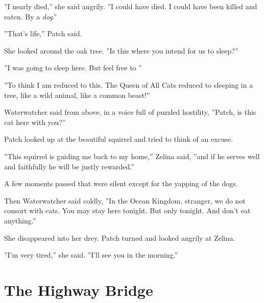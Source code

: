 \documentclass[12pt]{book}
\begin{document}
''I nearly died,'' she said angrily. ''I could have died. I could have been killed and eaten. By a {\it dog}.''\par
''That's life,'' Patch said.\par
She looked around the oak tree. ''Is this where you intend for us to sleep?''\par
''I was going to sleep here. But feel free to%
''\par
''To think I am reduced to this. The Queen of All Cats reduced to sleeping in a tree, like a wild animal, like a common beast!''\par
Waterwatcher said from above, in a voice full of puzzled hostility, ''Patch, is this cat here with you?''\par
Patch looked up at the beautiful squirrel and tried to think of an excuse.\par
''This squirrel is guiding me back to my home,'' Zelina said, ''and if he serves well and faithfully he will be justly rewarded.''\par
A few moments passed that were silent except for the yapping of the dogs.\par
Then Waterwatcher said coldly, ''In the Ocean Kingdom, stranger, we do not consort with cats. You may stay here tonight. But only tonight. And don't eat anything.''\par
She disappeared into her drey. Patch turned and looked angrily at Zelina.\par
''I'm very tired,'' she said. ''I'll see you in the morning.''\par

\section{The Highway Bridge}
\end{document}

